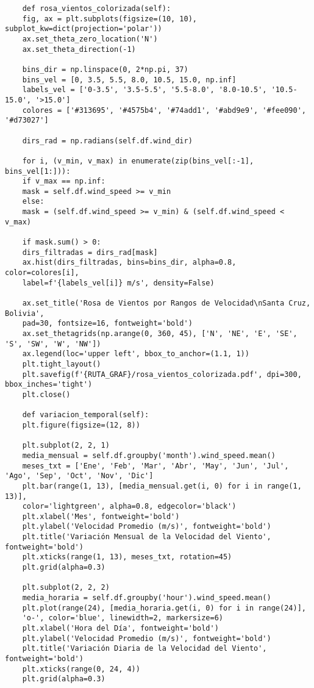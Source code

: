 \begin{lstlisting}
	def rosa_vientos_colorizada(self):
	fig, ax = plt.subplots(figsize=(10, 10), subplot_kw=dict(projection='polar'))
	ax.set_theta_zero_location('N')
	ax.set_theta_direction(-1)
	
	bins_dir = np.linspace(0, 2*np.pi, 37)
	bins_vel = [0, 3.5, 5.5, 8.0, 10.5, 15.0, np.inf]
	labels_vel = ['0-3.5', '3.5-5.5', '5.5-8.0', '8.0-10.5', '10.5-15.0', '>15.0']
	colores = ['#313695', '#4575b4', '#74add1', '#abd9e9', '#fee090', '#d73027']
	
	dirs_rad = np.radians(self.df.wind_dir)
	
	for i, (v_min, v_max) in enumerate(zip(bins_vel[:-1], bins_vel[1:])):
	if v_max == np.inf:
	mask = self.df.wind_speed >= v_min
	else:
	mask = (self.df.wind_speed >= v_min) & (self.df.wind_speed < v_max)
	
	if mask.sum() > 0:
	dirs_filtradas = dirs_rad[mask]
	ax.hist(dirs_filtradas, bins=bins_dir, alpha=0.8, color=colores[i], 
	label=f'{labels_vel[i]} m/s', density=False)
	
	ax.set_title('Rosa de Vientos por Rangos de Velocidad\nSanta Cruz, Bolivia', 
	pad=30, fontsize=16, fontweight='bold')
	ax.set_thetagrids(np.arange(0, 360, 45), ['N', 'NE', 'E', 'SE', 'S', 'SW', 'W', 'NW'])
	ax.legend(loc='upper left', bbox_to_anchor=(1.1, 1))
	plt.tight_layout()
	plt.savefig(f'{RUTA_GRAF}/rosa_vientos_colorizada.pdf', dpi=300, bbox_inches='tight')
	plt.close()
	
	def variacion_temporal(self):
	plt.figure(figsize=(12, 8))
	
	plt.subplot(2, 2, 1)
	media_mensual = self.df.groupby('month').wind_speed.mean()
	meses_txt = ['Ene', 'Feb', 'Mar', 'Abr', 'May', 'Jun', 'Jul', 'Ago', 'Sep', 'Oct', 'Nov', 'Dic']
	plt.bar(range(1, 13), [media_mensual.get(i, 0) for i in range(1, 13)], 
	color='lightgreen', alpha=0.8, edgecolor='black')
	plt.xlabel('Mes', fontweight='bold')
	plt.ylabel('Velocidad Promedio (m/s)', fontweight='bold')
	plt.title('Variación Mensual de la Velocidad del Viento', fontweight='bold')
	plt.xticks(range(1, 13), meses_txt, rotation=45)
	plt.grid(alpha=0.3)
	
	plt.subplot(2, 2, 2)
	media_horaria = self.df.groupby('hour').wind_speed.mean()
	plt.plot(range(24), [media_horaria.get(i, 0) for i in range(24)], 
	'o-', color='blue', linewidth=2, markersize=6)
	plt.xlabel('Hora del Día', fontweight='bold')
	plt.ylabel('Velocidad Promedio (m/s)', fontweight='bold')
	plt.title('Variación Diaria de la Velocidad del Viento', fontweight='bold')
	plt.xticks(range(0, 24, 4))
	plt.grid(alpha=0.3)
	

\end{lstlisting}
